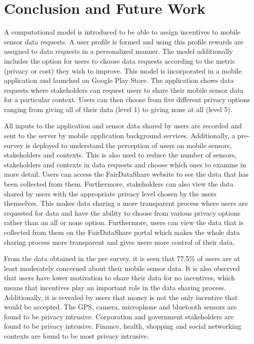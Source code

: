 \chapter{Conclusion and Future Work}

A computational model is introduced to be able to assign incentives to mobile sensor data requests. A user profile is formed and using this profile rewards are assigned to data requests in a personalized manner. The model additionally includes the option for users to choose data requests according to the metric (privacy or cost) they wish to improve. This model is incorporated in a mobile application and launched on Google Play Store. The application shows data requests where stakeholders can request users to share their mobile sensor data for a particular context. Users can then choose from five different privacy options ranging from giving all of their data (level 1) to giving none at all (level 5). 

All inputs to the application and sensor data shared by users are recorded and sent to the server by mobile application background services. Additionally, a pre-survey is deployed to understand the perception of users on mobile sensors, stakeholders and contexts. This is also used to reduce the number of sensors, stakeholders and contexts in data requests and choose which ones to examine in more detail. Users can access the FairDataShare website to see the data that has been collected from them. Furthermore, stakeholders can also view the data shared by users with the appropriate privacy level chosen by the users themselves. This makes data sharing a more transparent process where users are requested for data and have the ability to choose from various privacy options rather than an all or none option. Furthermore, users can view the data that is collected from them on the FairDataShare portal which makes the whole data sharing process more transparent and gives users more control of their data.

From the data obtained in the pre survey, it is seen that 77.5\% of users are at least moderately concerned about their mobile sensor data. It is also observed that users have lower motivation to share their data for no incentives, which means that incentives play an important role in the data sharing process. Additionally, it is revealed by users that money is not the only incentive that would be accepted. The GPS, camera, microphone and bluetooth sensors are found to be privacy intrusive. Corporation and government stakeholders are found to be privacy intrusive. Finance, health, shopping and social networking contexts are found to be most privacy intrusive.

